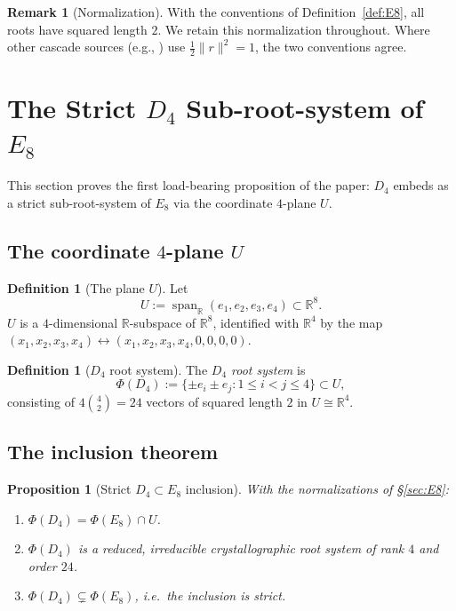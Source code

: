 \documentclass[11pt, a4paper]{amsart}
\newtheorem{proposition}[theorem]{Proposition}
\theoremstyle{definition}
\newtheorem{definition}[theorem]{Definition}
\newtheorem{remark}[theorem]{Remark}
\newcommand{\R}{\mathbb{R}}
\begin{document}
\begin{remark}[Normalization]
\label{rmk:normalization}
With the conventions of Definition~\ref{def:E8}, all roots have
squared length $2$. We retain this normalization throughout. Where
other cascade sources (e.g., \cite{CascadeEmbeddings}) use
$\frac{1}{2}\|r\|^2 = 1$, the two conventions agree.
\end{remark}

\section{The Strict $D_4$ Sub-root-system of $E_8$}
\label{sec:D4}

This section proves the first load-bearing proposition of the
paper: $D_4$ embeds as a strict sub-root-system of $E_8$ via the
coordinate $4$-plane $U$.

\subsection{The coordinate $4$-plane $U$}

\begin{definition}[The plane $U$]
\label{def:U}
Let
\[
  U := \operatorname{span}_\R(e_1, e_2, e_3, e_4) \subset \R^8.
\]
$U$ is a $4$-dimensional $\R$-subspace of $\R^8$, identified with
$\R^4$ by the map $(x_1, x_2, x_3, x_4) \leftrightarrow
(x_1, x_2, x_3, x_4, 0, 0, 0, 0)$.
\end{definition}

\begin{definition}[$D_4$ root system]
\label{def:D4}
The \emph{$D_4$ root system} is
\[
  \Phi(D_4) := \{\pm e_i \pm e_j : 1 \leq i < j \leq 4\} \subset U,
\]
consisting of $4 \binom{4}{2} = 24$ vectors of squared length $2$
in $U \cong \R^4$.
\end{definition}

\subsection{The inclusion theorem}

\begin{proposition}[Strict $D_4 \subset E_8$ inclusion]
\label{prop:D4-inclusion}
With the normalizations of \S\ref{sec:E8}:
\begin{enumerate}
\item $\Phi(D_4) = \Phi(E_8) \cap U$.
\item $\Phi(D_4)$ is a reduced, irreducible crystallographic root
  system of rank $4$ and order $24$.
\item $\Phi(D_4) \subsetneq \Phi(E_8)$, i.e.\ the inclusion is
  strict.
\end{enumerate}
\end{proposition}
\end{document}
